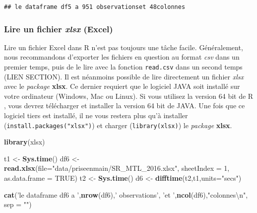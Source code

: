 \documentclass[
  11pt,
  french,
]{book}
\makeatletter
\newenvironment{Shaded}{\begin{snugshade}}{\end{snugshade}}
\newcommand{\CharTok}[1]{\textcolor[rgb]{0.31,0.60,0.02}{#1}}
\newcommand{\DataTypeTok}[1]{\textcolor[rgb]{0.13,0.29,0.53}{#1}}
\newcommand{\DecValTok}[1]{\textcolor[rgb]{0.00,0.00,0.81}{#1}}
\newcommand{\KeywordTok}[1]{\textcolor[rgb]{0.13,0.29,0.53}{\textbf{#1}}}
\newcommand{\NormalTok}[1]{#1}
\newcommand{\OtherTok}[1]{\textcolor[rgb]{0.56,0.35,0.01}{#1}}
\newcommand{\StringTok}[1]{\textcolor[rgb]{0.31,0.60,0.02}{#1}}
\newenvironment{kframe}{%
\medskip{}
\setlength{\fboxsep}{.8em}
 \def\at@end@of@kframe{}%
 \ifinner\ifhmode%
  \def\at@end@of@kframe{\end{minipage}}%
  \begin{minipage}{\columnwidth}%
 \fi\fi%
 \def\FrameCommand##1{\hskip\@totalleftmargin \hskip-\fboxsep
 \colorbox{shadecolor}{##1}\hskip-\fboxsep
     \hskip-\linewidth \hskip-\@totalleftmargin \hskip\columnwidth}%
 \MakeFramed {\advance\hsize-\width
   \@totalleftmargin\z@ \linewidth\hsize
   \@setminipage}}%
 {\par\unskip\endMakeFramed%
 \at@end@of@kframe}
\renewenvironment{Shaded}{\begin{kframe}}{\end{kframe}}
\makeatother
\begin{document}
\begin{verbatim}
## le dataframe df5 a 951 observationset 48colonnes
\end{verbatim}

\hypertarget{sect01416}{%
\subsubsection{\texorpdfstring{Lire un fichier \emph{xlsx} (Excel)}{Lire un fichier xlsx (Excel)}}\label{sect01416}}

Lire un fichier Excel dans R n'est pas toujours une tâche facile. Généralement, nous recommandons d'exporter les fichiers en question au format \emph{csv} dans un premier temps, puis de le lire avec la fonction \texttt{read.csv} dans un second temps (LIEN SECTION).
Il est néanmoins possible de lire directement un fichier \emph{xlsx} avec le \emph{package} \textbf{xlsx}. Ce dernier requiert que le logiciel JAVA soit installé sur votre ordinateur (Windows, Mac ou Linux). Si vous utilisez la version 64 bit de R , vous devrez télécharger et installer la version 64 bit de JAVA. Une fois que ce logiciel tiers est installé, il ne vous restera plus qu'à installer (\texttt{install.packages("xlsx")}) et charger (\texttt{library(xlsx)}) le \emph{package} \textbf{xlsx}.

\begin{Shaded}
\begin{Highlighting}[]
\KeywordTok{library}\NormalTok{(xlsx)}

\NormalTok{t1 <-}\StringTok{ }\KeywordTok{Sys.time}\NormalTok{()}
\NormalTok{df6 <-}\StringTok{ }\KeywordTok{read.xlsx}\NormalTok{(}\DataTypeTok{file=}\StringTok{"data/priseenmain/SR_MTL_2016.xlsx"}\NormalTok{,}
                 \DataTypeTok{sheetIndex =} \DecValTok{1}\NormalTok{,}
                 \DataTypeTok{as.data.frame =} \OtherTok{TRUE}\NormalTok{)}
\NormalTok{t2 <-}\StringTok{ }\KeywordTok{Sys.time}\NormalTok{()}
\NormalTok{d6 <-}\StringTok{ }\KeywordTok{difftime}\NormalTok{(t2,t1,}\DataTypeTok{units=}\StringTok{"secs"}\NormalTok{)}

\KeywordTok{cat}\NormalTok{(}\StringTok{'le dataframe df6 a '}\NormalTok{,}\KeywordTok{nrow}\NormalTok{(df6),}\StringTok{' observations'}\NormalTok{,}
    \StringTok{'et '}\NormalTok{,}\KeywordTok{ncol}\NormalTok{(df6),}\StringTok{"colonnes}\CharTok{\textbackslash{}n}\StringTok{"}\NormalTok{, }\DataTypeTok{sep =} \StringTok{""}\NormalTok{)}
\end{Highlighting}
\end{Shaded}
\end{document}
